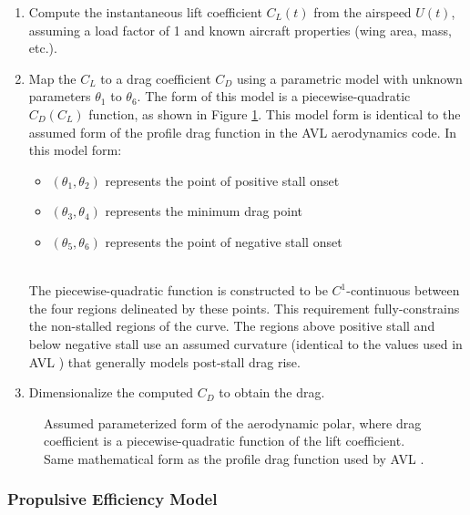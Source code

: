 \documentclass[conf]{new-aiaa}
\begin{document}
    \begin{enumerate}
        \item Compute the instantaneous lift coefficient $C_L(t)$ from the airspeed $U(t)$, assuming a load factor of 1 and known aircraft properties (wing area, mass, etc.).
        \item Map the $C_L$ to a drag coefficient $C_D$ using a parametric model with unknown parameters $\theta_1$ to $\theta_6$. The form of this model is a piecewise-quadratic $C_D(C_L)$ function, as shown in Figure \ref{fig:aero_polar_form}. This model form is identical to the assumed form of the profile drag function in the AVL \cite{drela_athena_2004} aerodynamics code. In this model form:\\
        \begin{itemize}
            \item $(\theta_1, \theta_2)$ represents the point of positive stall onset
            \item $(\theta_3, \theta_4)$ represents the minimum drag point
            \item $(\theta_5, \theta_6)$ represents the point of negative stall onset
        \end{itemize}
        \ \\The piecewise-quadratic function is constructed to be $C^1$-continuous between the four regions delineated by these points. This requirement fully-constrains the non-stalled regions of the curve. The regions above positive stall and below negative stall use an assumed curvature (identical to the values used in AVL \cite{drela_athena_2004}) that generally models post-stall drag rise.

        \item Dimensionalize the computed $C_D$ to obtain the drag.
    \end{enumerate}

    \begin{figure}[H]
        \centering
        
        \caption{Assumed parameterized form of the aerodynamic polar, where drag coefficient is a piecewise-quadratic function of the lift coefficient. Same mathematical form as the profile drag function used by AVL \cite{drela_athena_2004}.}
        \label{fig:aero_polar_form}
    \end{figure}

    \subsubsection{Propulsive Efficiency Model}
    \label{subsubsec:propulsive_efficiency_model}
\end{document}

